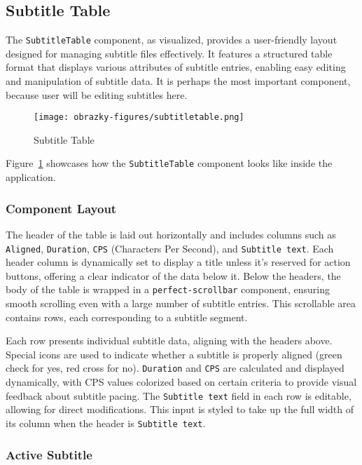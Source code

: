 \subsection{Subtitle Table}

The \texttt{SubtitleTable} component, as visualized, provides a user-friendly layout designed for managing subtitle files effectively. It features a structured table format that displays various attributes of subtitle entries, enabling easy editing and manipulation of subtitle data. It is perhaps the most important component, because user will be editing subtitles here. 

\begin{figure}[ht]
    \centering
    \texttt{[image: obrazky-figures/subtitletable.png]}
    \caption{Subtitle Table}
    \label{fig:implementation:subtitletable}
\end{figure}

Figure~\ref{fig:implementation:subtitletable} showcases how the \texttt{SubtitleTable} component looks like inside the application. 

\subsubsection{Component Layout}

The header of the table is laid out horizontally and includes columns such as \texttt{Aligned}, \texttt{Duration}, \texttt{CPS} (Characters Per Second), and \texttt{Subtitle text}. Each header column is dynamically set to display a title unless it's reserved for action buttons, offering a clear indicator of the data below it. Below the headers, the body of the table is wrapped in a \texttt{perfect-scrollbar} component, ensuring smooth scrolling even with a large number of subtitle entries. This scrollable area contains rows, each corresponding to a subtitle segment.

Each row presents individual subtitle data, aligning with the headers above. Special icons are used to indicate whether a subtitle is properly aligned (green check for yes, red cross for no). \texttt{Duration} and \texttt{CPS} are calculated and displayed dynamically, with CPS values colorized based on certain criteria to provide visual feedback about subtitle pacing. The \texttt{Subtitle text} field in each row is editable, allowing for direct modifications. This input is styled to take up the full width of its column when the header is \texttt{Subtitle text}.

\subsubsection{Active Subtitle}
\label{implement:subtitletable:active}

